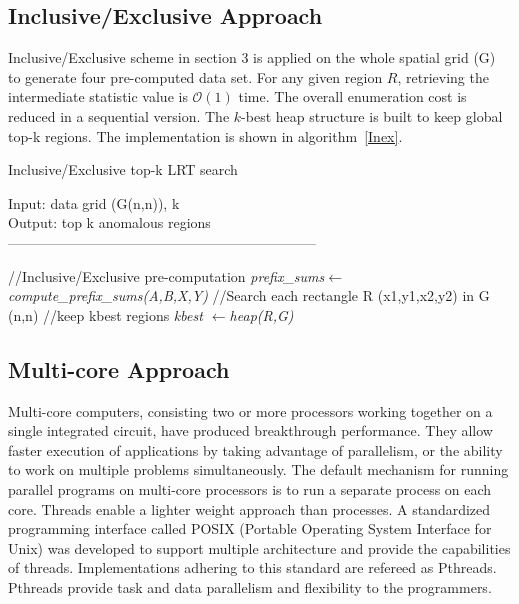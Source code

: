 \documentclass[AMA,LATO1COL]{WileyNJD-v2}
\newcommand\bigo{\mathcal O}
\begin{document}
\subsection{Inclusive/Exclusive Approach}
Inclusive/Exclusive scheme in section 3 is applied on the whole spatial grid (G) to generate four pre-computed data set. For any given region $R$, retrieving the intermediate statistic value is $\bigo(1)$ time. The overall enumeration cost is reduced in a sequential version. The $k$-best heap structure is built to keep global top-k regions. The implementation is shown in algorithm~\ref{Inex}.
\begin{algorithm}[t!]
\label{algobr1}
\caption{Inclusive/Exclusive top-k LRT search}\label{Inex}
Input: data grid (G(n,n)), k\\
Output: top k anomalous regions\\
------------------------------------------------------------------ \\
\begin{algorithmic}[1]
\State //Inclusive/Exclusive pre-computation
\State \textit  {prefix\_sums\(\leftarrow\)compute\_prefix\_sums(A,B,X,Y)}
\State //Search each rectangle R (x1,y1,x2,y2) in G (n,n)
\State //keep kbest regions
\State \textit {kbest \(\leftarrow\)heap(R,G)}
\EndFor
\EndFor
\EndFor
\EndFor
\end{algorithmic}
\end{algorithm}

\subsection{Multi-core Approach}
Multi-core computers, consisting two or more processors working together on a single integrated circuit, have produced breakthrough performance. They allow faster execution of applications by taking advantage of parallelism, or the ability to work on multiple problems simultaneously. The default mechanism for running parallel programs on multi-core processors is to run a separate process on each core. Threads enable a lighter weight approach than processes. A standardized programming interface called POSIX (Portable Operating System Interface for Unix) was developed to support multiple architecture and provide the capabilities of threads. Implementations adhering to this standard are refereed as Pthreads. Pthreads provide task and data parallelism and flexibility to the programmers.
\end{document}
